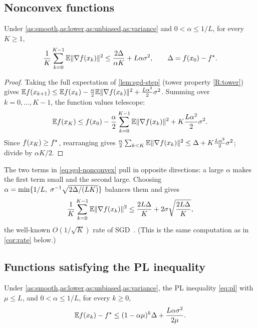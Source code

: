 \subsection{Nonconvex functions}

\begin{theorem}\label{thm:sgd-nonconvex}
Under \cref{as:smooth,as:lower,as:unbiased,as:variance} and $0<\alpha\le1/L$, for every
$K\ge1$,
\begin{equation}\label{eq:sgd-nonconvex}
  \frac1K\sum_{k=0}^{K-1}\mathbb{E}\lVert \nabla f(x_k)\rVert^2\le\frac{2\Delta}{\alpha K}+L\alpha\sigma^2,
  \qquad\Delta=f(x_0)-f^\star .
\end{equation}
\end{theorem}

\begin{proof}
Taking the full expectation of \cref{lem:sgd-step} (tower property \ref{R:tower}) gives
$\mathbb{E} f(x_{k+1})\le\mathbb{E} f(x_k)-\frac\alpha2\mathbb{E}\lVert \nabla f(x_k)\rVert^2+\frac{L\alpha^2}{2}\sigma^2$.
Summing over $k=0,\dots,K-1$, the function values telescope:
\[
  \mathbb{E} f(x_K)\le f(x_0)-\frac\alpha2\sum_{k=0}^{K-1}\mathbb{E}\lVert \nabla f(x_k)\rVert^2+K\frac{L\alpha^2}{2}\sigma^2 .
\]
Since $f(x_K)\ge f^\star$, rearranging gives
$\frac\alpha2\sum_{k<K}\mathbb{E}\lVert \nabla f(x_k)\rVert^2\le\Delta+K\frac{L\alpha^2}{2}\sigma^2$; divide by
$\alpha K/2$.
\end{proof}

The two terms in \eqref{eq:sgd-nonconvex} pull in opposite directions: a large $\alpha$
makes the first term small and the second large. Choosing
$\alpha=\min\{1/L,\;\sigma^{-1}\sqrt{2\Delta/(LK)}\}$ balances them and gives
\begin{equation}\label{eq:sgd-rate}
  \frac1K\sum_{k=0}^{K-1}\mathbb{E}\lVert \nabla f(x_k)\rVert^2\le\frac{2L\Delta}{K}+2\sigma\sqrt{\frac{2L\Delta}{K}},
\end{equation}
the well-known $O(1/\sqrt K)$ rate of SGD~\cite{ghadimilan2013}. (This is the same
computation as in \cref{cor:rate} below.)

\subsection{Functions satisfying the PL inequality}

\begin{theorem}[SGD, PL]\label{thm:sgd-pl}
Under \cref{as:smooth,as:lower,as:unbiased,as:variance}, the PL inequality \eqref{eq:pl}
with $\mu\le L$,
and $0<\alpha\le1/L$, for every $k\ge0$,
\[
  \mathbb{E} f(x_k)-f^\star\le(1-\alpha\mu)^k\Delta+\frac{L\alpha\sigma^2}{2\mu}.
\]
\end{theorem}


